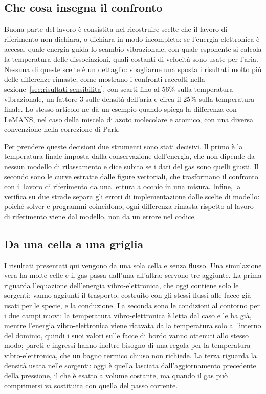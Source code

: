 \subsection{Che cosa insegna il confronto}
\label{sec:discussione-lezioni}

Buona parte del lavoro è consistita nel ricostruire scelte che il lavoro di riferimento non
dichiara, o dichiara in modo incompleto: se l'energia elettronica è accesa,
quale energia guida lo scambio vibrazionale, con quale esponente si calcola la
temperatura delle dissociazioni, quali costanti di velocità sono usate per
l'aria. Nessuna di queste scelte è un dettaglio: sbagliarne una sposta i
risultati molto più delle differenze rimaste, come mostrano i confronti raccolti nella
sezione~\ref{sec:risultati-sensibilita}, con scarti fino al 56\% sulla temperatura
vibrazionale, un fattore 3 sulle densità dell'aria e circa il 25\% sulla
temperatura finale. Lo stesso articolo ne dà un esempio quando spiega la
differenza con LeMANS, nel caso della miscela di azoto molecolare e atomico,
con una diversa convenzione nella
correzione di Park.

Per prendere queste decisioni due strumenti sono stati decisivi. Il primo è
la temperatura finale imposta dalla conservazione dell'energia, che non
dipende da nessun modello di rilassamento e dice subito se i dati del gas sono
quelli giusti. Il secondo sono le curve estratte dalle figure vettoriali, che
trasformano il confronto con il lavoro di riferimento da una lettura a occhio in una misura.
Infine, la verifica su due strade separa gli errori di implementazione dalle
scelte di modello: poiché solver e programmi coincidono, ogni differenza
rimasta rispetto al lavoro di riferimento viene dal modello, non da un errore
nel codice.

\subsection{Da una cella a una griglia}
\label{sec:discussione-multicella}

I risultati presentati qui vengono da una sola cella e senza flusso. Una
simulazione vera ha molte celle e il gas passa dall'una all'altra: servono tre
aggiunte. La prima riguarda l'equazione dell'energia vibro-elettronica, che
oggi contiene solo le sorgenti: vanno aggiunti il trasporto, costruito con gli
stessi flussi alle facce già usati per le specie, e la conduzione. La seconda
sono le condizioni al contorno per i due campi nuovi: la temperatura
vibro-elettronica è letta dal caso e le ha già, mentre l'energia
vibro-elettronica viene ricavata dalla temperatura solo all'interno del
dominio, quindi i suoi valori sulle facce di bordo vanno ottenuti allo stesso
modo; pareti e ingressi hanno inoltre bisogno di una regola per la temperatura
vibro-elettronica, che un bagno termico chiuso non richiede. La terza riguarda
la densità usata nelle sorgenti: oggi è quella lasciata dall'aggiornamento
precedente della pressione, il che è esatto a volume costante, ma quando il
gas può comprimersi va sostituita con quella del passo corrente.


